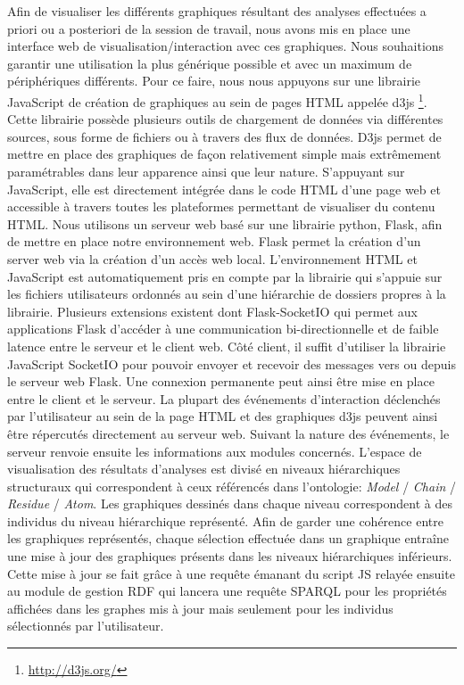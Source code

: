 Afin de visualiser les différents graphiques résultant des analyses effectuées a priori ou a posteriori de la session de travail, nous avons mis en place une interface web de visualisation/interaction avec ces graphiques. Nous souhaitions garantir une utilisation la plus générique possible et avec un maximum de périphériques différents. Pour ce faire, nous nous appuyons sur une librairie JavaScript de création de graphiques au sein de pages HTML appelée d3js \footnote{\url{http://d3js.org/}}. Cette librairie possède plusieurs outils de chargement de données via différentes sources, sous forme de fichiers ou à travers des flux de données. D3js permet de mettre en place des graphiques de façon relativement simple mais extrêmement paramétrables dans leur apparence ainsi que leur nature. S'appuyant sur JavaScript, elle est directement intégrée dans le code HTML d'une page web et accessible à travers toutes les plateformes permettant de visualiser du contenu HTML.
Nous utilisons un serveur web basé sur une librairie python, Flask, afin de mettre en place notre environnement web. Flask permet la création d'un server web via la création d'un accès web local. L'environnement HTML et JavaScript est automatiquement pris en compte par la librairie qui s'appuie sur les fichiers utilisateurs ordonnés au sein d'une hiérarchie de dossiers propres à la librairie. Plusieurs extensions existent dont Flask-SocketIO qui permet aux applications Flask d'accéder à une communication bi-directionnelle et de faible latence entre le serveur et le client web. Côté client, il suffit d'utiliser la librairie JavaScript SocketIO pour pouvoir envoyer et recevoir des messages vers ou depuis le serveur web Flask. Une connexion permanente peut ainsi être mise en place entre le client et le serveur.
La plupart des événements d'interaction déclenchés par l'utilisateur au sein de la page HTML et des graphiques d3js peuvent ainsi être répercutés directement au serveur web. Suivant la nature des événements, le serveur renvoie ensuite les informations aux modules concernés.
L'espace de visualisation des résultats d'analyses est divisé en niveaux hiérarchiques structuraux qui correspondent à ceux référencés dans l'ontologie: \textit{Model} / \textit{Chain} / \textit{Residue} / \textit{Atom}. Les graphiques dessinés dans chaque niveau correspondent à des individus du niveau hiérarchique représenté. Afin de garder une cohérence entre les graphiques représentés, chaque sélection effectuée dans un graphique entraîne une mise à jour des graphiques présents dans les niveaux hiérarchiques inférieurs. Cette mise à jour se fait grâce à une requête émanant du script JS relayée ensuite au module de gestion RDF qui lancera une requête SPARQL pour les propriétés affichées dans les graphes mis à jour mais seulement pour les individus sélectionnés par l'utilisateur.

